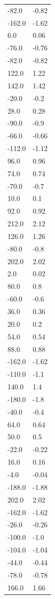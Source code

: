 \begin{longtable}{ll}
-82.0 & -0.82 \\
-162.0 & -1.62 \\
6.0 & 0.06 \\
-76.0 & -0.76 \\
-82.0 & -0.82 \\
122.0 & 1.22 \\
142.0 & 1.42 \\
-20.0 & -0.2 \\
28.0 & 0.28 \\
-90.0 & -0.9 \\
-66.0 & -0.66 \\
-112.0 & -1.12 \\
96.0 & 0.96 \\
74.0 & 0.74 \\
-70.0 & -0.7 \\
10.0 & 0.1 \\
92.0 & 0.92 \\
212.0 & 2.12 \\
126.0 & 1.26 \\
-80.0 & -0.8 \\
202.0 & 2.02 \\
2.0 & 0.02 \\
80.0 & 0.8 \\
-60.0 & -0.6 \\
36.0 & 0.36 \\
20.0 & 0.2 \\
54.0 & 0.54 \\
88.0 & 0.88 \\
-162.0 & -1.62 \\
-110.0 & -1.1 \\
140.0 & 1.4 \\
-180.0 & -1.8 \\
-40.0 & -0.4 \\
64.0 & 0.64 \\
50.0 & 0.5 \\
-22.0 & -0.22 \\
16.0 & 0.16 \\
-4.0 & -0.04 \\
-188.0 & -1.88 \\
202.0 & 2.02 \\
-162.0 & -1.62 \\
-26.0 & -0.26 \\
-100.0 & -1.0 \\
-104.0 & -1.04 \\
-44.0 & -0.44 \\
-78.0 & -0.78 \\
166.0 & 1.66 \\

\end{longtable}
